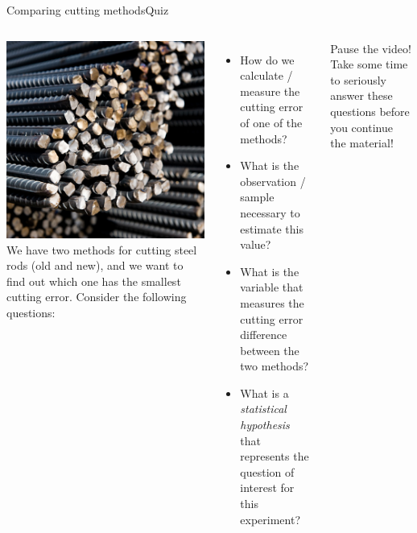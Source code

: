 \begin{frame}[t]{Comparing cutting methods}{Quiz}
  \begin{columns}[T]
    \includegraphics[width=\textwidth]{../img/steelrods}
    We have two methods for cutting steel rods (old and new), and we want to find out which one has the smallest cutting error. Consider the following questions:
    {\smaller
    \begin{itemize}
      \item How do we calculate / measure the cutting error of one of the methods?
      \item What is the observation / sample necessary to estimate this value?
      \item What is the variable that measures the cutting error difference between the two methods?
      \item What is a \emph{statistical hypothesis} that represents the question of interest for this experiment?
    \end{itemize}}\bigskip

    \alert{Pause the video}! Take some time to seriously answer these questions before you continue the material!
  \end{columns}
\end{frame}

